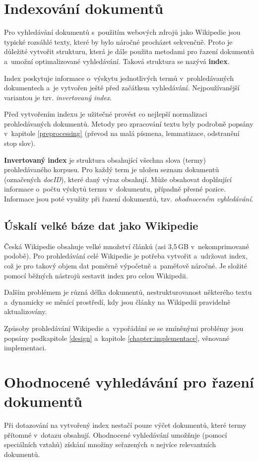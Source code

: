 \section{Indexování dokumentů}
Pro vyhledávání dokumentů s~použitím webových zdrojů jako Wikipedie jsou typické rozsáhlé texty, které by bylo náročné procházet sekvenčně. Proto je důležité vytvořit strukturu, která je dále použita metodami pro řazení dokumentů a~umožní optimalizované vyhledávání. Taková struktura se nazývá \textbf{index}.\par
Index poskytuje informace o~výskytu jednotlivých termů v~prohledávaných dokumentech a~je vytvořen ještě před začátkem vyhledávání. Nejpoužívanější variantou je tzv. \emph{invertovaný index}.\par
Před vytvořením indexu je užitečné provést co nejlepší normalizaci prohledávaných dokumentů. Metody pro zpracování textu byly podrobně popsány v~kapitole \ref{preprocessing} (převod na malá písmena, lemmatizace, odstranění stop slov).\par
\textbf{Invertovaný index} je struktura obsahující všechna slova (termy) prohledávaného korpusu. Pro každý term je uložen seznam dokumentů (označených \emph{docID}), které daný výraz obsahují. Může obsahovat doplňující informace o~počtu výskytů termu v~dokumentu, případně přesné pozice. Informace jsou poté využity při řazení dokumentů, tzv. \emph{ohodnoceném vyhledávání}.

\subsection{Úskalí velké báze dat jako Wikipedie}
Česká Wikipedie obsahuje velké množství článků (asi 3,5\,GB v~nekomprimované podobě). Pro prohledávání celé Wikipedie je potřeba vytvořit a~udržovat index, což je pro takový objem dat poměrně výpočetně a~paměťově náročné. Je složité pomocí běžných nástrojů sestavit index pro celou Wikipedii.\par
Dalším problémem je různá délka dokumentů, nestrukturovanost některého textu a~dynamicky se měnící prostředí, kdy jsou články na Wikipedii pravidelně aktualizovány.\par\enlargethispage{\baselineskip}
Způsoby prohledávání Wikipedie a~vypořádání se se zmíněnými problémy jsou popsány podkapitole \ref{design} a~kapitole \ref{chapter:implementace}, věnované implementaci.

\section{Ohodnocené vyhledávání pro řazení dokumentů}
Při dotazování na vytvořený index nestačí pouze výčet dokumentů, které termy přítomné v~dotazu obsahují. Ohodnocené vyhledávání umožňuje (pomocí speciálních vztahů) získání množiny seřazených \emph{n} nejvíce relevantních dokumentů.\par

